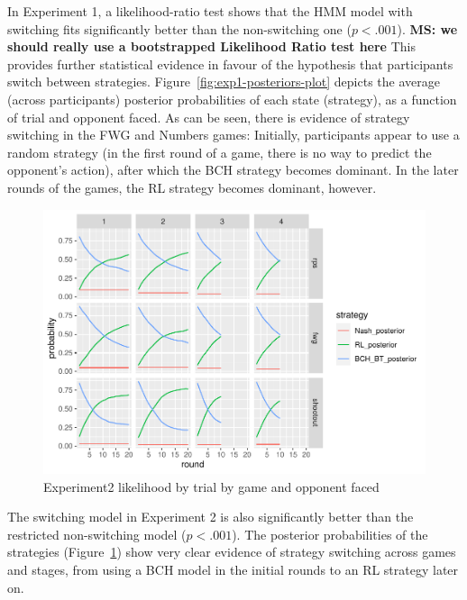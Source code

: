 \documentclass[man,floatsintext]{apa6}
\begin{document}
In Experiment 1, a likelihood-ratio test shows that the HMM model with switching fits significantly better than the non-switching one (\(p < .001\)). \textbf{MS: we should really use a bootstrapped Likelihood Ratio test here } This provides further statistical evidence in favour of the hypothesis that participants switch between strategies. Figure~\ref{fig:exp1-posteriors-plot} depicts the average (across participants) posterior probabilities of each state (strategy), as a function of trial and opponent faced. As can be seen, there is evidence of strategy switching in the FWG and Numbers games: Initially, participants appear to use a random strategy (in the first round of a game, there is no way to predict the opponent's action), after which the BCH strategy becomes dominant. In the later rounds of the games, the RL strategy becomes dominant, however.

\begin{figure}

{\centering \includegraphics{paper_draft_2021_files/figure-latex/exp2-posteriors-plot-1} 

}

\caption{Experiment2 likelihood by trial by game and opponent faced}\label{fig:exp2-posteriors-plot}
\end{figure}

The switching model in Experiment 2 is also significantly better than the restricted non-switching model (\(p < .001\)). The posterior probabilities of the strategies (Figure~\ref{fig:exp2-posteriors-plot}) show very clear evidence of strategy switching across games and stages, from using a BCH model in the initial rounds to an RL strategy later on.
\end{document}
